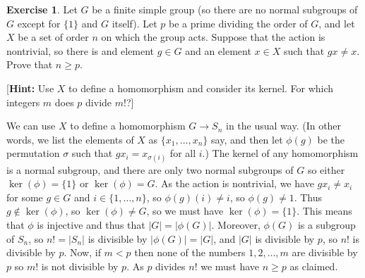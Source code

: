 \documentclass{amsart}
\newcommand{\xra}{\xrightarrow}
\renewcommand{\:}{\colon}
\newcommand{\sg}        {\sigma}
\theoremstyle{definition}
\newtheorem{exercise}{Exercise}
\newenvironment{solution}{{\noindent\bf Solution:}}{}
\begin{document}
\begin{exercise}
 Let $G$ be a finite simple group (so there are no normal subgroups of
 $G$ except for $\{1\}$ and $G$ itself).  Let $p$ be a prime dividing
 the order of $G$, and let $X$ be a set of order $n$ on which the
 group acts.  Suppose that the action is nontrivial, so there is and
 element $g\in G$ and an element $x\in X$ such that $gx\neq x$.  Prove
 that $n\geq p$.

 [{\bf Hint:} Use $X$ to define a homomorphism and consider its
 kernel.  For which integers $m$ does $p$ divide $m!$?]
\end{exercise}
\begin{solution}
 We can use $X$ to define a homomorphism $G\xra{}S_n$ in the usual
 way.  (In other words, we list the elements of $X$ as
 $\{x_1,\ldots,x_n\}$ say, and then let $\phi(g)$ be the permutation
 $\sg$ such that $gx_i=x_{\sg(i)}$ for all $i$.)  The kernel of any
 homomorphism is a normal subgroup, and there are only two normal
 subgroups of $G$ so either $\ker(\phi)=\{1\}$ or $\ker(\phi)=G$.  As
 the action is nontrivial, we have $gx_i\neq x_i$ for some $g\in G$
 and $i\in\{1,\ldots,n\}$, so $\phi(g)(i)\neq i$, so $\phi(g)\neq 1$.
 Thus $g\not\in\ker(\phi)$, so $\ker(\phi)\neq G$, so we must have
 $\ker(\phi)=\{1\}$.  This means that $\phi$ is injective and thus
 that $|G|=|\phi(G)|$.  Moreover, $\phi(G)$ is a subgroup of $S_n$, 
 so $n!=|S_n|$ is divisible by $|\phi(G)|=|G|$, and $|G|$ is divisible
 by $p$, so $n!$ is divisible by $p$.  Now, if $m<p$ then none of the
 numbers $1,2,\ldots,m$ are divisible by $p$ so $m!$ is not divisible
 by $p$.  As $p$ divides $n!$ we must have $n\geq p$ as claimed.
\end{solution}
\end{document}
